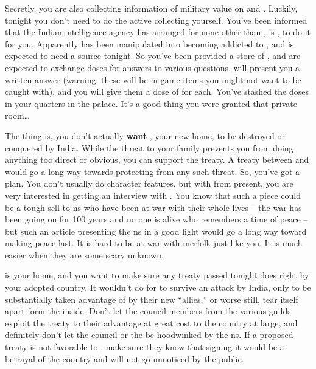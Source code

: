 \documentclass[char]{NeptuneBall}
\begin{document}
Secretly, you are also collecting information of military value on \pAtlantis{} and \pPacifica{}. Luckily, tonight you don't need to do the active collecting yourself. You've been informed that the Indian intelligence agency has arranged for none other than \cWillow{}, \cAriel{}'s \cWillow{\offspring}, to do it for you. Apparently \cWillow{} has been manipulated into becoming addicted to \iDrug{\MYname}, and is expected to need a source tonight. So you've been provided a store of \iDrug{}, and are expected to exchange doses for answers to various questions. \cWillow{} will present you a written answer (warning: these will be in game items you might not want to be caught with), and you will give them a dose of \iDrug{} for each. You've stashed the doses in your quarters in the palace. It's a good thing you were granted that private room\ldots{}

The thing is, you don't actually \textbf{want} \pAtlantis{}, your new home, to be destroyed or conquered by India. While the threat to your family prevents you from doing anything too direct or obvious, you can support the treaty. A treaty between \pAtlantis{} and \pPacifica{} would go a long way towards protecting \pAtlantis{} from any such threat. So, you've got a plan. You don't usually do character features, but with \cPrince{\aprince} from \pPacifica{} present, you are very interested in getting an interview with \cPrince{\them}. You know that such a piece could be a tough sell to \pAtlantis{}ns who have been at war with \pPacifica{} their whole lives -- the war has been going on for 100 years and no one is alive who remembers a time of peace -- but such an article presenting the \pPacifica{}ns in a good light would go a long way toward making peace last. It is hard to be at war with merfolk just like you. It is much easier when they are some scary unknown.

\pAtlantis{} is your home, and you want to make sure any treaty passed tonight does right by your adopted country. It wouldn't do for \pAtlantis{} to survive an attack by India, only to be substantially taken advantage of by their new ``allies,'' or worse still, tear itself apart form the inside. Don't let the council members from the various guilds exploit the treaty to their advantage at great cost to the country at large, and definitely don't let the council or the \cKing{\King} be hoodwinked by the \pPacifica{}ns. If a proposed treaty is not favorable to \pAtlantis{}, make sure they know that signing it would be a betrayal of the country and will not go unnoticed by the public. 
\end{document}
